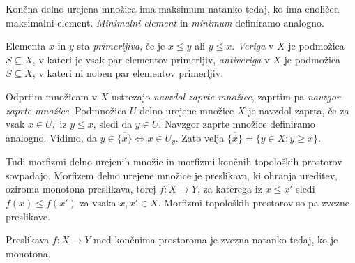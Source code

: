 \documentclass[mat1]{fmfdelo}
\begin{document}
Končna delno urejena množica ima maksimum natanko tedaj, ko ima enoličen maksimalni element. \emph{Minimalni element} in \emph{minimum} definiramo analogno.

Elementa $x$ in $y$ sta \emph{primerljiva}, če je $x\leq y$ ali $y\leq x$. \emph{Veriga} v $X$ je podmožica $S\subseteq X$, v kateri je vsak par elementov primerljiv, \emph{antiveriga} v $X$ je podmožica $S\subseteq X$, v kateri ni noben par elementov primerljiv. 

Odprtim množicam v $X$ ustrezajo \emph{navzdol zaprte množice}, zaprtim pa \emph{navzgor zaprte množice}. Podmnožica $U$
delno urejene množice $X$ je navzdol zaprta, če za vsak $x\in U,$ iz 
$y\leq x$, sledi da $y\in U$. Navzgor zaprte množice definiramo analogno.
Vidimo, da $y\in \overline{\{x\}} \Leftrightarrow x\in U_y$.
Zato velja $\overline{\{x\}}=\{y\in X; y\geq x\}$. 

Tudi morfizmi delno urejenih množic in morfizmi končnih topoloških prostorov sovpadajo.
  Morfizem delno urejene množice je preslikava, ki ohranja ureditev, oziroma monotona preslikava, torej $f\colon  X\rightarrow Y$, 
  za katerega iz $x\leq x'$ sledi $f(x)\leq f(x')$ za vsaka $x,x'\in X$. Morfizmi topoloških prostorov so pa zvezne preslikave.

\begin{trditev}
Preslikava $f\colon X\rightarrow Y$ med končnima prostoroma je zvezna natanko tedaj, ko je monotona.
\end{trditev}

%
\end{document}
